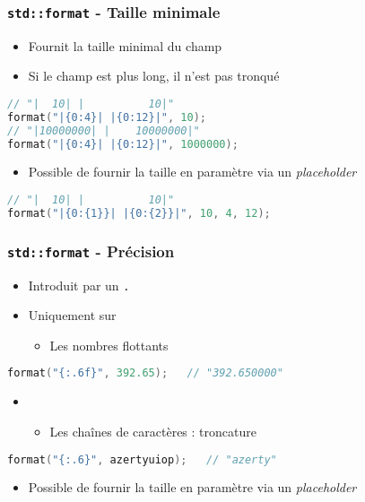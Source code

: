 \documentclass[C++.tex]{subfiles}
\begin{document}
\begin{frame}[fragile]
	\frametitle{\lstinline|std::format| - Taille minimale}
	\begin{itemize}
		\item Fournit la taille minimal du champ
		\item Si le champ est plus long, il n'est pas tronqué
	\end{itemize}

	\begin{lstlisting}[language=C++]
// "|  10| |          10|"
format("|{0:4}| |{0:12}|", 10);
// "|10000000| |    10000000|"
format("|{0:4}| |{0:12}|", 1000000);\end{lstlisting}

	\begin{itemize}
		\item Possible de fournir la taille en paramètre via un \textit{placeholder}
	\end{itemize}

	\begin{lstlisting}[language=C++]
// "|  10| |          10|"
format("|{0:{1}}| |{0:{2}}|", 10, 4, 12);\end{lstlisting}
\end{frame}

\begin{frame}[fragile]
	\frametitle{\lstinline|std::format| - Précision}
	\begin{itemize}
		\item Introduit par un \lstinline|.|
		\item Uniquement sur
		\begin{itemize}
			\item Les nombres flottants
		\end{itemize}
	\end{itemize}

	\begin{lstlisting}[language=C++]
format("{:.6f}", 392.65);   // "392.650000"\end{lstlisting}

	\begin{itemize}
		\item [] \begin{itemize}
			\item Les chaînes de caractères : troncature
		\end{itemize}
	\end{itemize}

	\begin{lstlisting}[language=C++]
format("{:.6}", azertyuiop);   // "azerty"\end{lstlisting}

	\begin{itemize}
		\item Possible de fournir la taille en paramètre via un \textit{placeholder}
	\end{itemize}
\end{frame}
\end{document}
